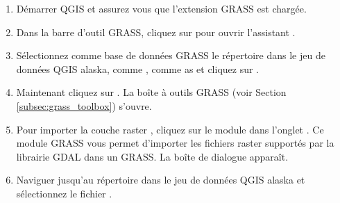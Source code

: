 \begin{enumerate}
  \item D\'emarrer QGIS et assurez vous que l'extension GRASS est charg\'ee.
  \item Dans la barre d'outil GRASS, cliquez sur  pour ouvrir l'assistant .
  \item S\'electionnez comme base de donn\'ees GRASS le r\'epertoire  dans le jeu de donn\'ees QGIS alaska, comme , comme as   et cliquez sur .
  \item Maintenant cliquez sur . La bo\^ite \`a outils GRASS (voir Section \ref{subsec:grass_toolbox}) s'ouvre.
  \item  Pour importer la couche raster , cliquez sur le module  dans l'onglet . Ce module GRASS vous permet d'importer les fichiers raster support\'es par la librairie GDAL dans un  GRASS. La bo\^ite de dialogue   appara\^it.
  \item Naviguer jusqu'au r\'epertoire  dans le jeu de donn\'ees QGIS alaska et s\'electionnez le fichier .

\end{enumerate}

